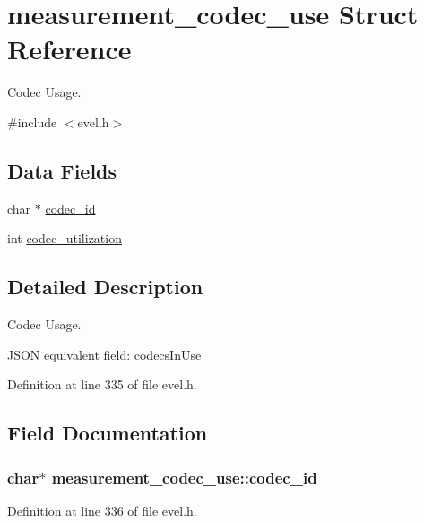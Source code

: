 \hypertarget{structmeasurement__codec__use}{}\section{measurement\+\_\+codec\+\_\+use Struct Reference}
\label{structmeasurement__codec__use}


Codec Usage.  




{\ttfamily \#include $<$evel.\+h$>$}

\subsection*{Data Fields}
\begin{DoxyCompactItemize}
\item 
char $\ast$ \hyperlink{structmeasurement__codec__use_aa84452b4ffcae1ccec4e40f8570f63a9}{codec\+\_\+id}
\item 
int \hyperlink{structmeasurement__codec__use_aedcede04d123d6cdb450ac8faf35bf35}{codec\+\_\+utilization}
\end{DoxyCompactItemize}


\subsection{Detailed Description}
Codec Usage. 

J\+S\+O\+N equivalent field\+: codecs\+In\+Use 

Definition at line 335 of file evel.\+h.



\subsection{Field Documentation}
\hypertarget{structmeasurement__codec__use_aa84452b4ffcae1ccec4e40f8570f63a9}{}
\subsubsection[{codec\+\_\+id}]{\setlength{\rightskip}{0pt plus 5cm}char$\ast$ measurement\+\_\+codec\+\_\+use\+::codec\+\_\+id}\label{structmeasurement__codec__use_aa84452b4ffcae1ccec4e40f8570f63a9}


Definition at line 336 of file evel.\+h.

